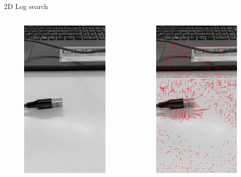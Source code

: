 \documentclass[aspectratio=1610,xcolor=dvipsnames]{beamer}
\begin{document}
\begin{frame}{2D Log search}
	
	\begin{columns}
		\begin{column}{0.5\textwidth}
			\begin{figure}
				\centering
				\includegraphics[keepaspectratio, width=.5\linewidth]{images/bbme-im.png}
			\end{figure}
		\end{column}
		\begin{column}{0.5\textwidth}
			\begin{figure}
				\centering
				\includegraphics[keepaspectratio, width=.5\linewidth]{images/bbme-2-res.png}
			\end{figure}
		\end{column}
	\end{columns}
\end{frame}
\end{document}

